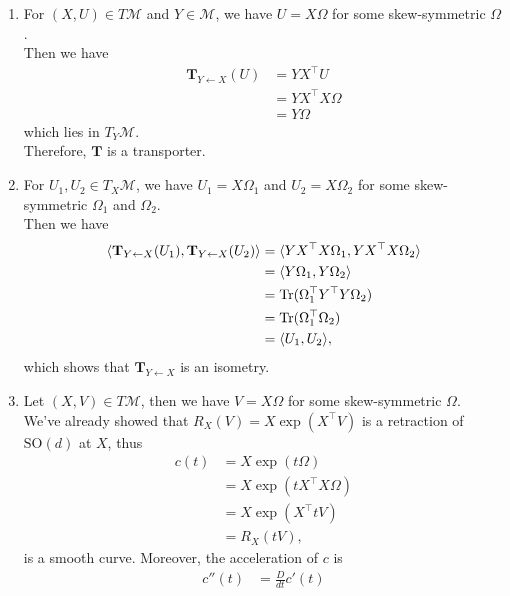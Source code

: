 \documentclass[en, oneside]{assignment}
\begin{document}
\begin{sol}
    \begin{enumerate}[label=(\arabic*)]
        \item For $(X, U) \in T \mathcal{M}$ and $Y \in \mathcal{M}$, we have $U = X \Omega$ for some skew-symmetric $\Omega$.\\
        Then we have
        \begin{align*}
            \mathbf{T}_{Y \leftarrow X} (U) &= Y X^\top U\\
            &= Y X^\top X \Omega\\
            &= Y \Omega
        \end{align*}
        which lies in $T_Y \mathcal{M}$.\\
        Therefore, $\mathbf{T}$ is a transporter.
        \item For $U_1, U_2 \in T_X \mathcal{M}$, we have $U_1 = X \Omega_1$ and $U_2 = X \Omega_2$ for some skew-symmetric $\Omega_1$ and $\Omega_2$.\\
        Then we have
        \begin{align*}
            \langle \mathbf{T}_{Y \leftarrow X} (U_1), \mathbf{T}_{Y \leftarrow X} (U_2) \rangle &= \langle Y X^\top X \Omega_1, Y X^\top X \Omega_2 \rangle\\
            &= \langle Y \Omega_1, Y \Omega_2 \rangle\\
            &= \operatorname{Tr} (\Omega_1^\top Y^\top Y \Omega_2)\\
            &= \operatorname{Tr} (\Omega_1^\top \Omega_2)\\
            &= \langle U_1, U_2 \rangle,
        \end{align*}
        which shows that $\mathbf{T}_{Y \leftarrow X}$ is an isometry.
        \item Let $(X, V) \in T \mathcal{M}$, then we have $V = X \Omega$ for some skew-symmetric $\Omega$.\\
        We've already showed that $R_X(V) = X \exp (X^\top V)$ is a retraction of $\text{SO}(d)$ at $X$, thus 
        \begin{align*}
            c(t) &= X \exp(t \Omega)\\
            &= X \exp(t X^\top X \Omega)\\
            &= X \exp(X^\top t V)\\
            &= R_X(t V),
        \end{align*}
        is a smooth curve. Moreover, the acceleration of $c$ is
        \begin{align*}
            c''(t) &= \frac{D}{dt} c'(t)\\

\end{align*}
\end{enumerate}
\end{sol}
\end{document}
